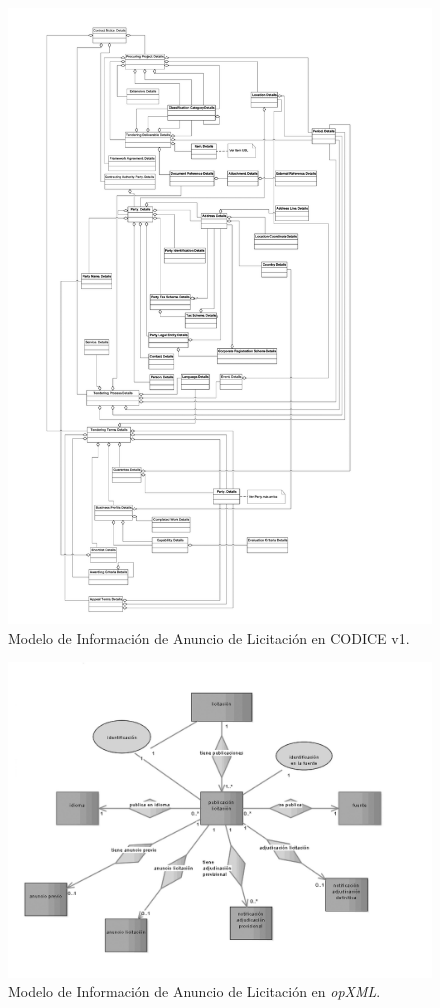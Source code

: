 \begin{figure}[!htb]
\centering
	\includegraphics[width=14cm]{images/phd/eproc/codice-1}
\caption{Modelo de Información de Anuncio de Licitación en CODICE v1.}
\label{fig:codice-1}
\end{figure}

\begin{figure}[!htb]
\centering
	\includegraphics[width=18cm]{images/phd/eproc/10ders-1}
\caption{Modelo de Información de Anuncio de Licitación en \textit{opXML}.}
\label{fig:10ders-1}
\end{figure}

